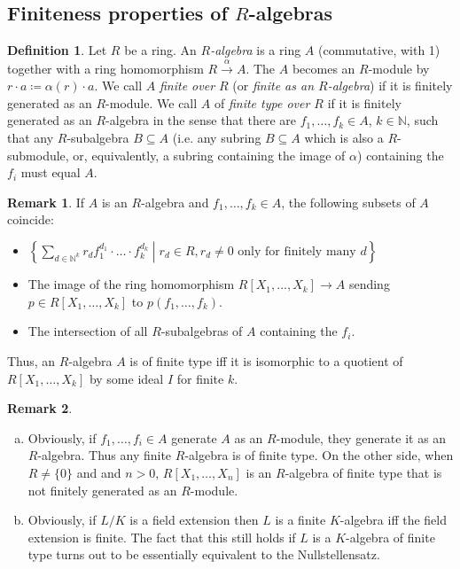 \documentclass[DIV=14,parskip=half]{scrartcl}
\theoremstyle{definition}
\newtheorem{defi}{Definition}[subsection]
\newtheorem{rem}{Remark}[subsection]
\newcommand{\N}{\mathbb{N}}
\newcommand{\longto}{\longrightarrow}
\begin{document}
\subsection{Finiteness properties of $R$-algebras}
\begin{defi}
 Let $R$ be a ring. An \emph{$R$-algebra} is a ring $A$ (commutative, with 1) together with a ring homomorphism $R\overset{\alpha}{\longto} A$. The $A$ becomes an $R$-module by $r\cdot a \coloneqq \alpha(r) \cdot a$. We call $A$ \emph{finite over $R$} (or \emph{finite as an $R$-algebra}) if it is finitely generated as an $R$-module. We call $A$ of \emph{finite type over $R$} if it is finitely generated as an $R$-algebra in the sense that there are $f_1,\dots, f_k\in A$, $k\in \N$, such that any $R$-subalgebra $B\subseteq A$ (i.e. any subring $B\subseteq A$ which is also a $R$-submodule, or, equivalently, a subring containing the image of $\alpha$) containing the $f_i$ must equal $A$.
\end{defi}
\begin{rem}
 If $A$ is an $R$-algebra and $f_1,\dots,f_k\in A$, the following subsets of $A$ coincide:
 \begin{itemize}
  \item $\left\{\sum_{d\in \N^k} r_d f_1^{d_1}\cdot\dots\cdot f_k^{d_k}\middle | r_d\in R, r_d\neq 0 \text{ only for finitely many } d\right\}$
  \item The image of the ring homomorphism $R[X_1,\dots,X_k]\longto A$ sending $p\in R[X_1,\dots, X_k]$ to $p(f_1,\dots,f_k)$.
  \item The intersection of all $R$-subalgebras of $A$ containing the $f_i$.
 \end{itemize}
Thus, an $R$-algebra $A$ is of finite type iff it is isomorphic to a quotient of $R[X_1,\dots, X_k]$ by some ideal $I$ for finite $k$.
\end{rem}
\begin{rem}
\begin{enumerate}[a)]
 \item Obviously, if $f_1,\dots, f_i\in A$ generate $A$ as an $R$-module, they generate it as an $R$-algebra. Thus any finite $R$-algebra is of finite type. On the other side, when $R\neq \{0\}$ and and $n>0$, $R[X_1, \dots, X_n]$ is an $R$-algebra of finite type that is not finitely generated as an $R$-module.
\item Obviously, if $L/K$ is a field extension then $L$ is a finite $K$-algebra iff the field extension is finite. The fact that this still holds if $L$ is a $K$-algebra of finite type turns out to be essentially equivalent to the Nullstellensatz.
 \end{enumerate}

\end{rem}
\end{document}
